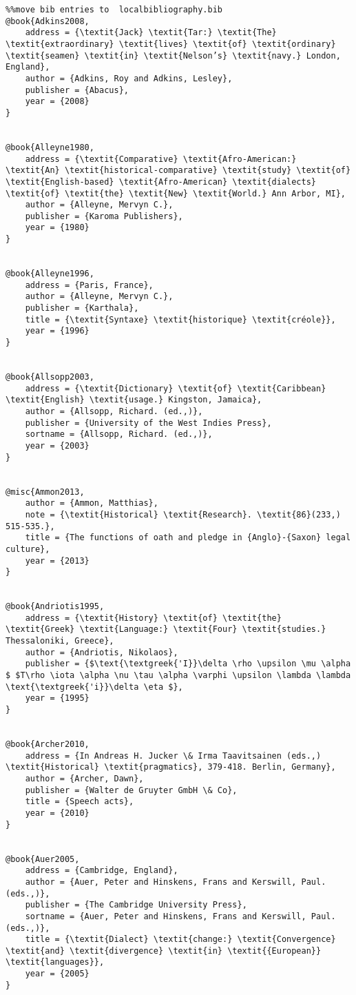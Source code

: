 \begin{verbatim}%%move bib entries to  localbibliography.bib
@book{Adkins2008,
	address = {\textit{Jack} \textit{Tar:} \textit{The} \textit{extraordinary} \textit{lives} \textit{of} \textit{ordinary} \textit{seamen} \textit{in} \textit{Nelson’s} \textit{navy.} London, England},
	author = {Adkins, Roy and Adkins, Lesley},
	publisher = {Abacus},
	year = {2008}
}


@book{Alleyne1980,
	address = {\textit{Comparative} \textit{Afro-American:} \textit{An} \textit{historical-comparative} \textit{study} \textit{of} \textit{English-based} \textit{Afro-American} \textit{dialects} \textit{of} \textit{the} \textit{New} \textit{World.} Ann Arbor, MI},
	author = {Alleyne, Mervyn C.},
	publisher = {Karoma Publishers},
	year = {1980}
}


@book{Alleyne1996,
	address = {Paris, France},
	author = {Alleyne, Mervyn C.},
	publisher = {Karthala},
	title = {\textit{Syntaxe} \textit{historique} \textit{créole}},
	year = {1996}
}


@book{Allsopp2003,
	address = {\textit{Dictionary} \textit{of} \textit{Caribbean} \textit{English} \textit{usage.} Kingston, Jamaica},
	author = {Allsopp, Richard. (ed.,)},
	publisher = {University of the West Indies Press},
	sortname = {Allsopp, Richard. (ed.,)},
	year = {2003}
}


@misc{Ammon2013,
	author = {Ammon, Matthias},
	note = {\textit{Historical} \textit{Research}. \textit{86}(233,) 515-535.},
	title = {The functions of oath and pledge in {Anglo}-{Saxon} legal culture},
	year = {2013}
}


@book{Andriotis1995,
	address = {\textit{History} \textit{of} \textit{the} \textit{Greek} \textit{Language:} \textit{Four} \textit{studies.} Thessaloniki, Greece},
	author = {Andriotis, Nikolaos},
	publisher = {$\text{\textgreek{'I}}\delta \rho \upsilon \mu \alpha $ $T\rho \iota \alpha \nu \tau \alpha \varphi \upsilon \lambda \lambda \text{\textgreek{'i}}\delta \eta $},
	year = {1995}
}


@book{Archer2010,
	address = {In Andreas H. Jucker \& Irma Taavitsainen (eds.,) \textit{Historical} \textit{pragmatics}, 379-418. Berlin, Germany},
	author = {Archer, Dawn},
	publisher = {Walter de Gruyter GmbH \& Co},
	title = {Speech acts},
	year = {2010}
}


@book{Auer2005,
	address = {Cambridge, England},
	author = {Auer, Peter and Hinskens, Frans and Kerswill, Paul. (eds.,)},
	publisher = {The Cambridge University Press},
	sortname = {Auer, Peter and Hinskens, Frans and Kerswill, Paul. (eds.,)},
	title = {\textit{Dialect} \textit{change:} \textit{Convergence} \textit{and} \textit{divergence} \textit{in} \textit{{European}} \textit{languages}},
	year = {2005}
}



\end{verbatim}
